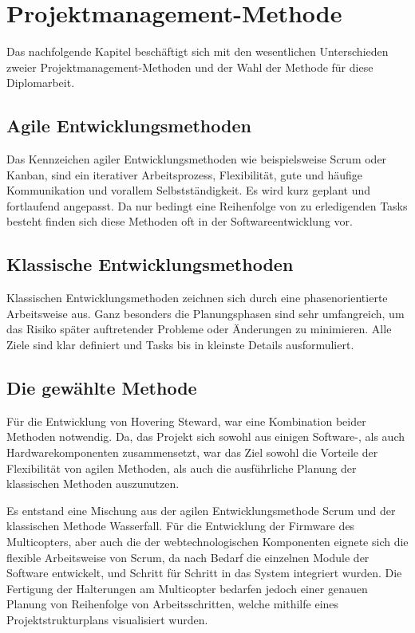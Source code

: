 \section{Projektmanagement-Methode}
Das nachfolgende Kapitel beschäftigt sich mit den wesentlichen Unterschieden
zweier Projektmanagement-Methoden und der Wahl der Methode für diese Diplomarbeit.

  \subsection{Agile Entwicklungsmethoden}
  Das Kennzeichen agiler Entwicklungsmethoden wie beispielsweise Scrum oder Kanban, sind
  ein iterativer Arbeitsprozess, Flexibilität, gute und häufige Kommunikation und vorallem
  Selbstständigkeit. Es wird kurz geplant und fortlaufend angepasst. Da nur bedingt eine Reihenfolge
  von zu erledigenden Tasks besteht finden sich diese Methoden oft in der Softwareentwicklung vor.

  \subsection{Klassische Entwicklungsmethoden}
  Klassischen Entwicklungsmethoden zeichnen sich durch eine phasenorientierte Arbeitsweise aus.
  Ganz besonders die Planungsphasen sind sehr umfangreich, um das Risiko später auftretender Probleme oder
  Änderungen zu minimieren. Alle Ziele sind klar definiert und Tasks bis in kleinste Details ausformuliert.

  \subsection{Die gewählte Methode}
  Für die Entwicklung von Hovering Steward, war eine Kombination beider Methoden notwendig. Da,
  das Projekt sich sowohl aus einigen Software-, als auch Hardwarekomponenten zusammensetzt, war das
  Ziel sowohl die Vorteile der Flexibilität von agilen Methoden, als auch die ausführliche Planung der klassischen
  Methoden auszunutzen.

  Es entstand eine Mischung aus der agilen Entwicklungsmethode Scrum und der klassischen Methode Wasserfall.
  Für die Entwicklung der Firmware des Multicopters, aber auch die der webtechnologischen Komponenten eignete
  sich die flexible Arbeitsweise von Scrum, da nach Bedarf die einzelnen Module der Software entwickelt, und Schritt
  für Schritt in das System integriert wurden.
  Die Fertigung der Halterungen am Multicopter bedarfen jedoch einer genauen Planung von Reihenfolge von Arbeitsschritten,
  welche mithilfe eines Projektstrukturplans visualisiert wurden.

